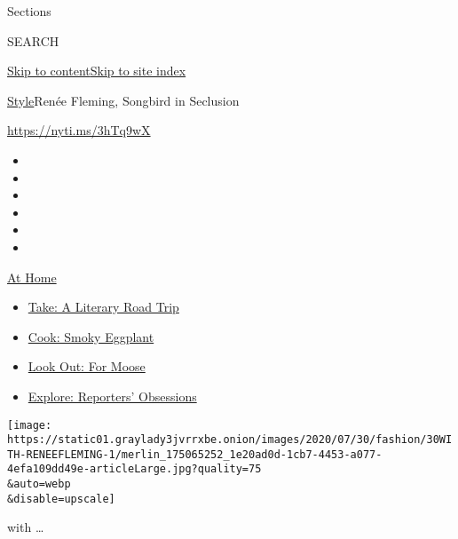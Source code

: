 Sections

SEARCH

\protect\hyperlink{site-content}{Skip to
content}\protect\hyperlink{site-index}{Skip to site index}

\href{/section/style}{Style}\textbar{}Renée Fleming, Songbird in
Seclusion

\url{https://nyti.ms/3hTq9wX}

\begin{itemize}
\item
\item
\item
\item
\item
\item
\end{itemize}

\href{https://www.nytimes3xbfgragh.onion/spotlight/at-home?action=click\&pgtype=Article\&state=default\&region=TOP_BANNER\&context=at_home_menu}{At
Home}

\begin{itemize}
\tightlist
\item
  \href{https://www.nytimes3xbfgragh.onion/2020/07/28/books/time-for-a-literary-road-trip.html?action=click\&pgtype=Article\&state=default\&region=TOP_BANNER\&context=at_home_menu}{Take:
  A Literary Road Trip}
\item
  \href{https://www.nytimes3xbfgragh.onion/2020/07/29/magazine/bored-with-your-home-cooking-some-smoky-eggplant-will-fix-that.html?action=click\&pgtype=Article\&state=default\&region=TOP_BANNER\&context=at_home_menu}{Cook:
  Smoky Eggplant}
\item
  \href{https://www.nytimes3xbfgragh.onion/2020/07/27/travel/moose-michigan-isle-royale.html?action=click\&pgtype=Article\&state=default\&region=TOP_BANNER\&context=at_home_menu}{Look
  Out: For Moose}
\item
  \href{https://www.nytimes3xbfgragh.onion/interactive/2020/at-home/even-more-reporters-editors-diaries-lists-recommendations.html?action=click\&pgtype=Article\&state=default\&region=TOP_BANNER\&context=at_home_menu}{Explore:
  Reporters' Obsessions}
\end{itemize}

\texttt{[image: https://static01.graylady3jvrrxbe.onion/images/2020/07/30/fashion/30WITH-RENEEFLEMING-1/merlin\_175065252\_1e20ad0d-1cb7-4453-a077-4efa109dd49e-articleLarge.jpg?quality=75\\\&auto=webp\\\&disable=upscale]}

with \ldots{}

